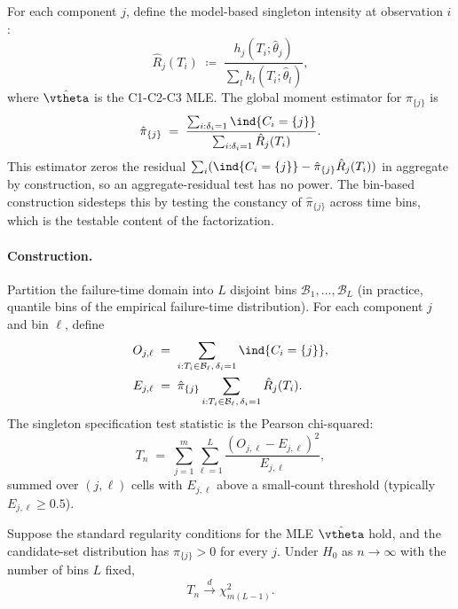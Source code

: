 For each component $j$, define the model-based singleton intensity at
observation $i$:
\begin{equation}
\label{eq:Rj-singleton}
    \hat R_j(T_i) \;\coloneqq\; \frac{h_j(T_i; \hat\theta_j)}
                                       {\sum_l h_l(T_i; \hat\theta_l)},
\end{equation}
where $\hat\vtheta$ is the C1-C2-C3 MLE. The global moment estimator for
$\pi_{\{j\}}$ is
\begin{equation}
\label{eq:pi-singleton-est}
    \hat\pi_{\{j\}} \;=\;
    \frac{\sum_{i: \delta_i = 1} \ind{C_i = \{j\}}}
         {\sum_{i: \delta_i = 1} \hat R_j(T_i)}.
\end{equation}
This estimator zeros the residual $\sum_i (\ind{C_i = \{j\}} -
\hat\pi_{\{j\}} \hat R_j(T_i))$ in aggregate by construction, so an
aggregate-residual test has no power. The bin-based construction
sidesteps this by testing the constancy of $\hat\pi_{\{j\}}$ across time
bins, which is the testable content of the factorization.

\paragraph{Construction.}
Partition the failure-time domain into $L$ disjoint bins
$\mathcal{B}_1, \ldots, \mathcal{B}_L$ (in practice, quantile bins of the
empirical failure-time distribution). For each component $j$ and bin
$\ell$, define
\begin{align}
\label{eq:pearson-cells}
    O_{j, \ell} \;&=\; \sum_{i : T_i \in \mathcal{B}_\ell,\, \delta_i = 1}
                       \ind{C_i = \{j\}}, \\
    E_{j, \ell} \;&=\; \hat\pi_{\{j\}}
                       \sum_{i : T_i \in \mathcal{B}_\ell,\, \delta_i = 1}
                       \hat R_j(T_i).
\end{align}
The singleton specification test statistic is the Pearson chi-squared:
\begin{equation}
\label{eq:T-stat}
    T_n \;=\; \sum_{j = 1}^{m} \sum_{\ell = 1}^{L}
              \frac{(O_{j, \ell} - E_{j, \ell})^2}{E_{j, \ell}},
\end{equation}
summed over $(j, \ell)$ cells with $E_{j, \ell}$ above a small-count
threshold (typically $E_{j, \ell} \geq 0.5$).

\begin{theorem}
\label{thm:asymptotic-spec}
Suppose the standard regularity conditions for the MLE $\hat\vtheta$
hold, and the candidate-set distribution has $\pi_{\{j\}} > 0$ for every
$j$. Under $H_0$ as $n \to \infty$ with the number of bins $L$ fixed,
\begin{equation}
    T_n \xrightarrow{d} \chi^2_{m(L - 1)}.
\end{equation}
\end{theorem}

